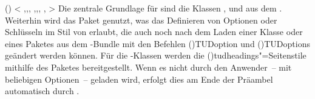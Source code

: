 \begin{DeclareEntity}{}
\begin{DeclarePackages}
\itempkg{}()
  <
    ,,,
    ,,,
    ,
  >
  Die zentrale Grundlage für \TUDScript sind die Klassen , 
   und  aus dem . 
  Weiterhin wird das Paket  genutzt, was das Definieren von 
  Optionen oder Schlüsseln im Stil von \KOMAScript erlaubt, die auch noch nach 
  dem Laden einer Klasse oder eines Paketes aus dem \TUDScript-Bundle mit den 
  Befehlen \Macro(){TUDoption} und \Macro(){TUDoptions} geändert werden können. 
  Für die \TUDScript-Klassen werden die \PageStyle(){tudheadings}"=Seitenstile 
  mithilfe des Paketes  bereitgestellt. Wenn es nicht 
  durch den Anwender~-- mit beliebigen Optionen~-- geladen wird, erfolgt dies 
  am Ende der Präambel automatisch durch \TUDScript.
\end{DeclarePackages}
\end{DeclareEntity}
